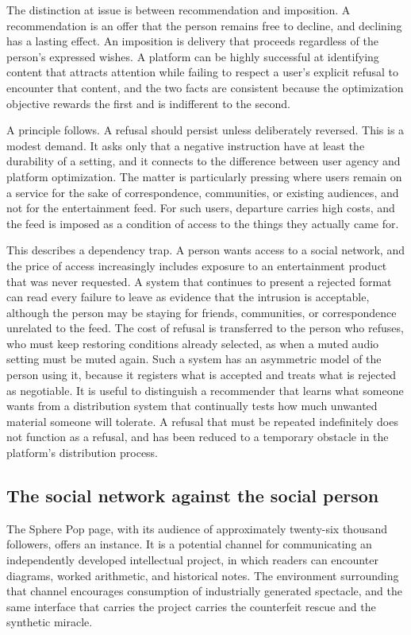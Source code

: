 \documentclass[12pt]{article}
\theoremstyle{plain}
\theoremstyle{definition}
\theoremstyle{remark}
\begin{document}
The distinction at issue is between recommendation and imposition. A recommendation is an offer that the person remains free to decline, and declining has a lasting effect. An imposition is delivery that proceeds regardless of the person's expressed wishes. A platform can be highly successful at identifying content that attracts attention while failing to respect a user's explicit refusal to encounter that content, and the two facts are consistent because the optimization objective rewards the first and is indifferent to the second.

A principle follows. A refusal should persist unless deliberately reversed. This is a modest demand. It asks only that a negative instruction have at least the durability of a setting, and it connects to the difference between user agency and platform optimization. The matter is particularly pressing where users remain on a service for the sake of correspondence, communities, or existing audiences, and not for the entertainment feed. For such users, departure carries high costs, and the feed is imposed as a condition of access to the things they actually came for.

This describes a dependency trap. A person wants access to a social network, and the price of access increasingly includes exposure to an entertainment product that was never requested. A system that continues to present a rejected format can read every failure to leave as evidence that the intrusion is acceptable, although the person may be staying for friends, communities, or correspondence unrelated to the feed. The cost of refusal is transferred to the person who refuses, who must keep restoring conditions already selected, as when a muted audio setting must be muted again. Such a system has an asymmetric model of the person using it, because it registers what is accepted and treats what is rejected as negotiable. It is useful to distinguish a recommender that learns what someone wants from a distribution system that continually tests how much unwanted material someone will tolerate. A refusal that must be repeated indefinitely does not function as a refusal, and has been reduced to a temporary obstacle in the platform's distribution process.

\subsection{The social network against the social person}

The Sphere Pop page, with its audience of approximately twenty-six thousand followers, offers an instance. It is a potential channel for communicating an independently developed intellectual project, in which readers can encounter diagrams, worked arithmetic, and historical notes. The environment surrounding that channel encourages consumption of industrially generated spectacle, and the same interface that carries the project carries the counterfeit rescue and the synthetic miracle.
\end{document}
